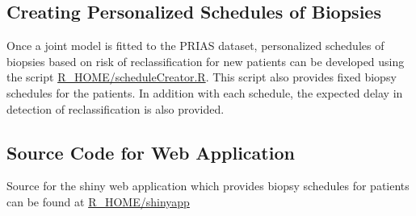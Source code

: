 \subsection{Creating Personalized Schedules of Biopsies}
Once a joint model is fitted to the PRIAS dataset, personalized schedules of biopsies based on risk of reclassification for new patients can be developed using the script \url{R_HOME/scheduleCreator.R}. This script also provides fixed biopsy schedules for the patients. In addition with each schedule, the expected delay in detection of reclassification is also provided.

\subsection{Source Code for Web Application}
Source for the shiny web application which provides biopsy schedules for patients can be found at \url{R_HOME/shinyapp}
